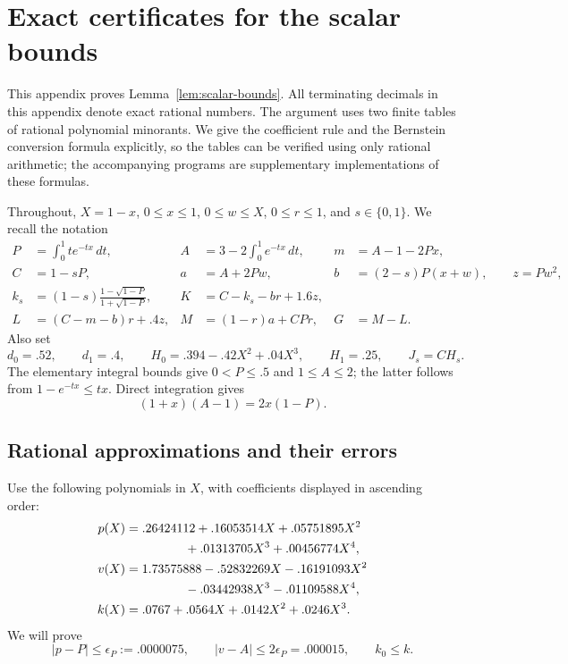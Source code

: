 \section{Exact certificates for the scalar bounds}
\label{app:certificates}

This appendix proves Lemma~\ref{lem:scalar-bounds}.  All terminating
decimals in this appendix denote exact rational numbers.  The argument
uses two finite tables of rational polynomial minorants.  We give the
coefficient rule and the Bernstein conversion formula explicitly, so the
tables can be verified using only rational arithmetic; the accompanying
programs are supplementary implementations of these formulas.

Throughout, $X=1-x$, $0\le x\le1$, $0\le w\le X$, $0\le r\le1$, and
$s\in\{0,1\}$.  We recall the notation
\begin{align*}
 P&=\int_0^1t e^{-tx}\,dt,&
 A&=3-2\int_0^1e^{-tx}\,dt,&
 m&=A-1-2Px,\\
 C&=1-sP,& a&=A+2Pw,& b&=(2-s)P(x+w),\qquad z=Pw^2,\\
 k_s&=(1-s)\frac{1-\sqrt{1-P}}{1+\sqrt{1-P}},&
 K&=C-k_s-br+1.6z,\\
 L&=(C-m-b)r+.4z,&
 M&=(1-r)a+CPr,& G&=M-L.
\end{align*}
Also set
\[
 d_0=.52,\qquad d_1=.4,\qquad
 H_0=.394-.42X^2+.04X^3,\qquad H_1=.25,\qquad J_s=CH_s.
\]
The elementary integral bounds give $0<P\le.5$ and $1\le A\le2$;
the latter follows from $1-e^{-tx}\le tx$.  Direct integration gives
\begin{equation}
 (1+x)(A-1)=2x(1-P).
 \label{eq:cert-integral-identity}
\end{equation}

\subsection{Rational approximations and their errors}
\label{sec:cert-interpolation}

Use the following polynomials in $X$, with coefficients displayed in
ascending order:
\begin{equation}
\begin{aligned}
 p(X)={}&.26424112+.16053514X+.05751895X^2\\
        &\hspace{12mm}+.01313705X^3+.00456774X^4,\\
 v(X)={}&1.73575888-.52832269X-.16191093X^2\\
        &\hspace{12mm}-.03442938X^3-.01109588X^4,\\
 k(X)={}&.0767+.0564X+.0142X^2+.0246X^3.
\end{aligned}
\label{eq:cert-interpolants}
\end{equation}
We will prove
\begin{equation}
 |p-P|\le\epsilon_P:=.0000075,\qquad
 |v-A|\le2\epsilon_P=.000015,\qquad k_0\le k.
 \label{eq:cert-approximation-errors}
\end{equation}

